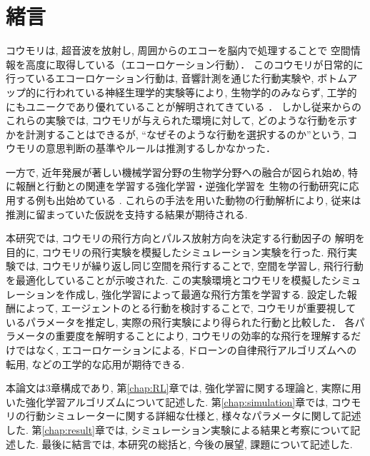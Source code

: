 \documentclass[../main]{subfiles}
\begin{document}
\newpage
\chapter*{緒言}

コウモリは, 超音波を放射し, 周囲からのエコーを脳内で処理することで
空間情報を高度に取得している（エコーロケーション行動）．
このコウモリが日常的に行っているエコーロケーション行動は, 
音響計測を通じた行動実験や, 
ボトムアップ的に行われている神経生理学的実験等により, 
生物学的のみならず, 
工学的にもユニークであり優れていることが解明されてきている
\cite{ref:bat_enhance}\cite{ref:echolocating_bats}．
しかし従来からのこれらの実験では, 
コウモリが与えられた環境に対して, 
どのような行動を示すかを計測することはできるが, 
“なぜそのような行動を選択するのか”という, 
コウモリの意思判断の基準やルールは推測するしかなかった．

一方で, 近年発展が著しい機械学習分野の生物学分野への融合が図られ始め, 
特に報酬と行動との関連を学習する強化学習・逆強化学習を
生物の行動研究に応用する例も出始めている
\cite{ref:simulating_bout}\cite{ref:can_ai}.
これらの手法を用いた動物の行動解析により, 
従来は推測に留まっていた仮説を支持する結果が期待される.

本研究では, コウモリの飛行方向とパルス放射方向を決定する行動因子の
解明を目的に, コウモリの飛行実験を模擬したシミュレーション実験を行った.
飛行実験では, コウモリが繰り返し同じ空間を飛行することで, 
空間を学習し, 飛行行動を最適化していることが示唆された.
この実験環境とコウモリを模擬したシミュレーションを作成し, 
強化学習によって最適な飛行方策を学習する.
設定した報酬によって, エージェントのとる行動を検討することで, 
コウモリが重要視しているパラメータを推定し, 
実際の飛行実験により得られた行動と比較した．
各パラメータの重要度を解明することにより, 
コウモリの効率的な飛行を理解するだけではなく, 
エコーロケーションによる, 
ドローンの自律飛行アルゴリズムへの転用, 
などの工学的な応用が期待できる.

本論文は3章構成であり, 
第\ref{chap:RL}章では, 
強化学習に関する理論と, 
実際に用いた強化学習アルゴリズムについて記述した.
第\ref{chap:simulation}章では, 
コウモリの行動シミュレーターに関する詳細な仕様と, 
様々なパラメータに関して記述した.
第\ref{chap:result}章では, 
シミュレーション実験による結果と考察について記述した.
最後に結言では, 本研究の総括と, 
今後の展望, 課題について記述した.
\end{document}
